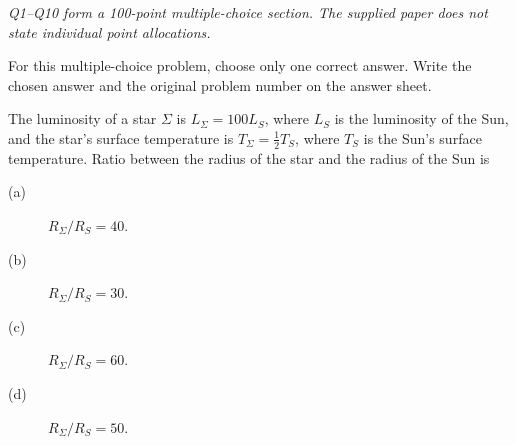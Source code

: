 \textit{Q1--Q10 form a 100-point multiple-choice section. The supplied paper
does not state individual point allocations.}

For this multiple-choice problem, choose only one correct answer. Write the
chosen answer and the original problem number on the answer sheet.

The luminosity of a star $\Sigma$ is $L_\Sigma=100L_S$, where $L_S$ is the
luminosity of the Sun, and the star's surface temperature is
$T_\Sigma=\frac12T_S$, where $T_S$ is the Sun's surface temperature.
Ratio between the radius of the star and the radius of the Sun is
\begin{description}
\item[(a)] $R_\Sigma/R_S=40$.
\item[(b)] $R_\Sigma/R_S=30$.
\item[(c)] $R_\Sigma/R_S=60$.
\item[(d)] $R_\Sigma/R_S=50$.
\end{description}
